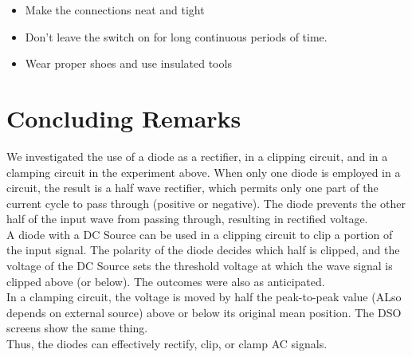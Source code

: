 \documentclass{article}
\begin{document}
\begin{itemize}
\item Make the connections neat and tight
\item Don’t leave the switch on for long continuous periods of time.
\item Wear proper shoes and use insulated tools
\end{itemize}

\vspace{5px}

\section{Concluding Remarks}
We investigated the use of a diode as a rectifier, in a clipping circuit, and in a clamping circuit in the experiment above. When only one diode is employed in a circuit, the result is a half wave rectifier, which permits only one part of the current cycle to pass through (positive or negative). The diode prevents the other half of the input wave from passing through, resulting in rectified voltage. \\

\noindent
A diode with a DC Source can be used in a clipping circuit to clip a portion of the input signal. The polarity of the diode decides which half is clipped, and the voltage of the DC Source sets the threshold voltage at which the wave signal is clipped above (or below). The outcomes were also as anticipated. \\

\noindent
In a clamping circuit, the voltage is moved by half the peak-to-peak value (ALso depends on external source) above or below its original mean position. The DSO screens show the same thing.  \\

\noindent
Thus, the diodes can effectively rectify, clip, or clamp AC signals.
\end{document}
